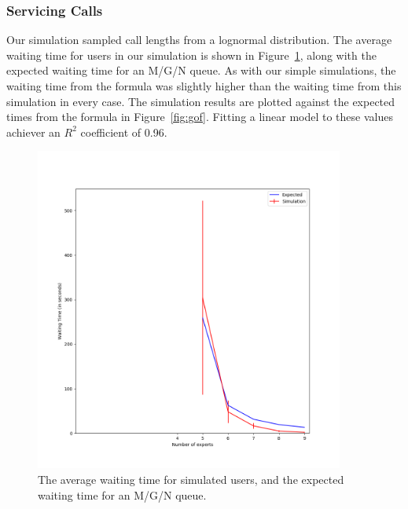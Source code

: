\subsubsection{Servicing Calls}

Our simulation sampled call lengths from a lognormal distribution.
The average waiting time for users in our simulation is shown in
Figure~\ref{fig:full_expected_sim}, along with the expected waiting time for an
M/G/N queue.
As with our simple simulations, the waiting time from the formula was slightly
higher than the waiting time from this simulation in every case.
The simulation results are plotted against the expected times from the formula
in Figure~\ref{fig:gof}.
Fitting a linear model to these values achiever an $R^2$ coefficient of 0.96.

\begin{figure}[h]
  \includegraphics[width=4in]{figures/montecarlo/full_expected_sim.png}
  \caption{
    The average waiting time for simulated users, and the expected waiting time
    for an M/G/N queue.
  }\label{fig:full_expected_sim}
\end{figure}

